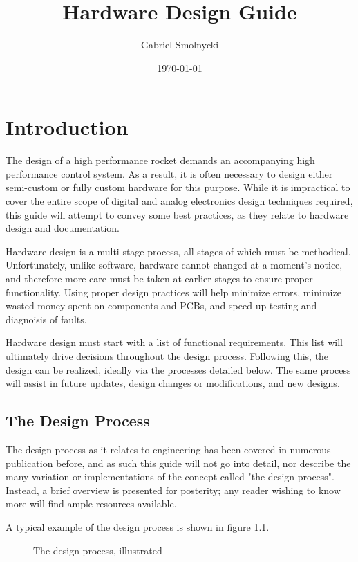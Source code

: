 \documentclass[12pt,article]{memoir}
\title{Hardware Design Guide}
\author{Gabriel Smolnycki}
\date{\today}
\begin{document}
	


\tableofcontents*
\clearpage


\chapter{Introduction}
The design of a high performance rocket demands an accompanying high performance control system. As a result, it is often necessary to design either semi-custom or fully custom hardware for this purpose. While it is impractical to cover the entire scope of digital and analog electronics design techniques required, this guide will attempt to convey some best practices, as they relate to hardware design and documentation.\par
Hardware design is a multi-stage process, all stages of which must be methodical. Unfortunately, unlike software, hardware cannot changed at a moment's notice, and therefore more care must be taken at earlier stages to ensure proper functionality. Using proper design practices will help minimize errors, minimize wasted money spent on components and PCBs, and speed up testing and diagnoisis of faults.\par
Hardware design must start with a list of functional requirements. This list will ultimately drive decisions throughout the design process. Following this, the design can be realized, ideally via the processes detailed below. The same process will assist in future updates, design changes or modifications, and new designs.\par
\section{The Design Process}
The design process as it relates to engineering has been covered in numerous publication before, and as such this guide will not go into detail, nor describe the many variation or implementations of the concept called "the design process". Instead, a brief overview is presented for posterity; any reader wishing to know more will find ample resources available.\par
A typical example of the design process is shown in figure \ref{fig:design}.

\begin{figure}[H]
	\centering
	\caption{The design process, illustrated}
	\label{fig:design}
\end{figure}
\end{document}
